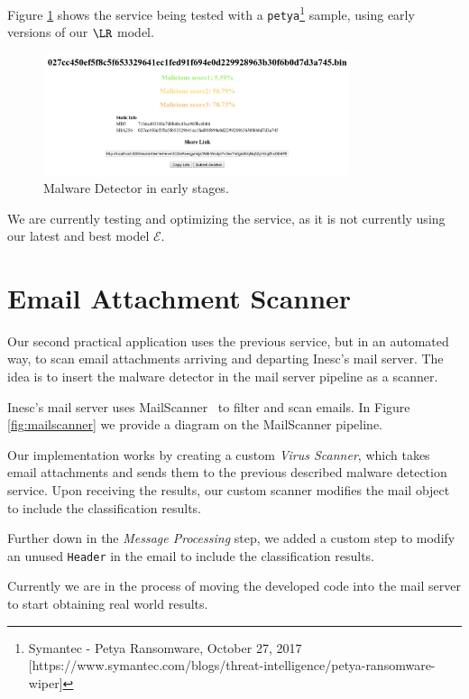 Figure \ref{fig:malware_detetor} shows the service being tested with a \texttt{petya}\footnote{Symantec - Petya Ransomware, October 27, 2017 [https://www.symantec.com/blogs/threat-intelligence/petya-ransomware-wiper]} sample, using early versions of our $\LR$ model.

\begin{figure}[!h]
	\centering
	\includegraphics[width=0.8\textwidth]{Figures/malware_detector.png}
	\caption{Malware Detector in early stages.}
	\label{fig:malware_detetor}
\end{figure}

We are currently testing and optimizing the service, as it is not currently using our latest and best model $\mathcal{E}$.

\section{Email Attachment Scanner}
\label{section:email_scanner}

Our second practical application uses the previous service, but in an automated way, to scan email attachments arriving and departing Inesc's mail server.
The idea is to insert the malware detector in the mail server pipeline as a scanner.

Inesc's mail server uses MailScanner~\cite{tool:mailscanner} to filter and scan emails.
In Figure \ref{fig:mailscanner} we provide a diagram on the MailScanner pipeline.

Our implementation works by creating a custom \textit{Virus Scanner}, which takes email attachments and sends them to the previous described malware detection service.
Upon receiving the results, our custom scanner modifies the mail object to include the classification results.

Further down in the \textit{Message Processing} step, we added a custom step to modify an unused \texttt{Header} in the email to include the classification results.

Currently we are in the process of moving the developed code into the mail server to start obtaining real world results.

